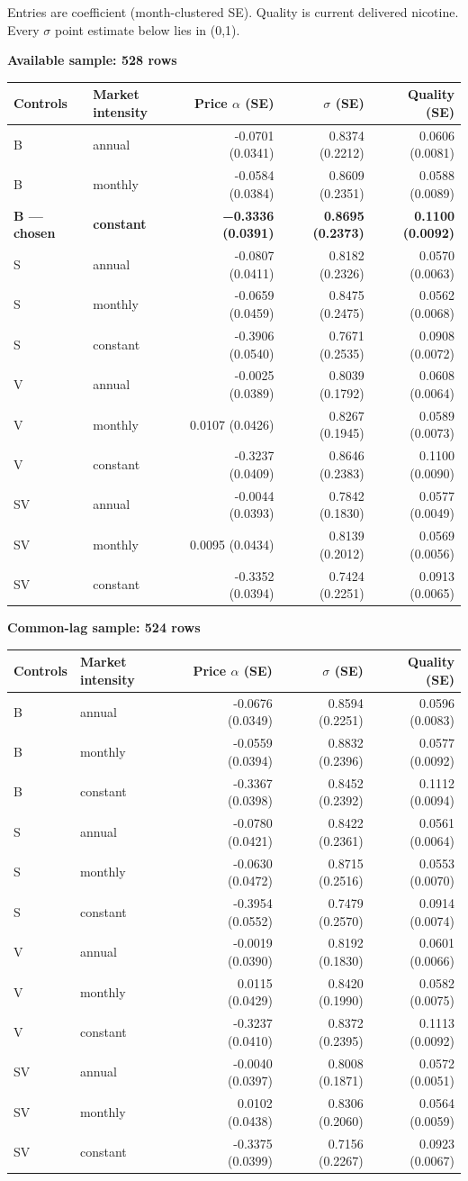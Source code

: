 \documentclass[10pt,]{article}
\begin{document}
Entries are coefficient (month-clustered SE). Quality is current
delivered nicotine. Every \(\sigma\) point estimate below lies in (0,1).

\textbf{Available sample: 528 rows}

\begin{longtable}[]{@{}llrrr@{}}
\toprule
Controls & Market intensity & Price \(\alpha\) (SE) & \(\sigma\) (SE) &
Quality (SE)\tabularnewline
\midrule
\endhead
B & annual & -0.0701 (0.0341) & 0.8374 (0.2212) & 0.0606
(0.0081)\tabularnewline
B & monthly & -0.0584 (0.0384) & 0.8609 (0.2351) & 0.0588
(0.0089)\tabularnewline
\textbf{B --- chosen} & \textbf{constant} & \textbf{−0.3336 (0.0391)} &
\textbf{0.8695 (0.2373)} & \textbf{0.1100 (0.0092)}\tabularnewline
S & annual & -0.0807 (0.0411) & 0.8182 (0.2326) & 0.0570
(0.0063)\tabularnewline
S & monthly & -0.0659 (0.0459) & 0.8475 (0.2475) & 0.0562
(0.0068)\tabularnewline
S & constant & -0.3906 (0.0540) & 0.7671 (0.2535) & 0.0908
(0.0072)\tabularnewline
V & annual & -0.0025 (0.0389) & 0.8039 (0.1792) & 0.0608
(0.0064)\tabularnewline
V & monthly & 0.0107 (0.0426) & 0.8267 (0.1945) & 0.0589
(0.0073)\tabularnewline
V & constant & -0.3237 (0.0409) & 0.8646 (0.2383) & 0.1100
(0.0090)\tabularnewline
SV & annual & -0.0044 (0.0393) & 0.7842 (0.1830) & 0.0577
(0.0049)\tabularnewline
SV & monthly & 0.0095 (0.0434) & 0.8139 (0.2012) & 0.0569
(0.0056)\tabularnewline
SV & constant & -0.3352 (0.0394) & 0.7424 (0.2251) & 0.0913
(0.0065)\tabularnewline
\bottomrule
\end{longtable}

\textbf{Common-lag sample: 524 rows}

\begin{longtable}[]{@{}llrrr@{}}
\toprule
Controls & Market intensity & Price \(\alpha\) (SE) & \(\sigma\) (SE) &
Quality (SE)\tabularnewline
\midrule
\endhead
B & annual & -0.0676 (0.0349) & 0.8594 (0.2251) & 0.0596
(0.0083)\tabularnewline
B & monthly & -0.0559 (0.0394) & 0.8832 (0.2396) & 0.0577
(0.0092)\tabularnewline
B & constant & -0.3367 (0.0398) & 0.8452 (0.2392) & 0.1112
(0.0094)\tabularnewline
S & annual & -0.0780 (0.0421) & 0.8422 (0.2361) & 0.0561
(0.0064)\tabularnewline
S & monthly & -0.0630 (0.0472) & 0.8715 (0.2516) & 0.0553
(0.0070)\tabularnewline
S & constant & -0.3954 (0.0552) & 0.7479 (0.2570) & 0.0914
(0.0074)\tabularnewline
V & annual & -0.0019 (0.0390) & 0.8192 (0.1830) & 0.0601
(0.0066)\tabularnewline
V & monthly & 0.0115 (0.0429) & 0.8420 (0.1990) & 0.0582
(0.0075)\tabularnewline
V & constant & -0.3237 (0.0410) & 0.8372 (0.2395) & 0.1113
(0.0092)\tabularnewline
SV & annual & -0.0040 (0.0397) & 0.8008 (0.1871) & 0.0572
(0.0051)\tabularnewline
SV & monthly & 0.0102 (0.0438) & 0.8306 (0.2060) & 0.0564
(0.0059)\tabularnewline
SV & constant & -0.3375 (0.0399) & 0.7156 (0.2267) & 0.0923
(0.0067)\tabularnewline
\bottomrule
\end{longtable}
\end{document}
